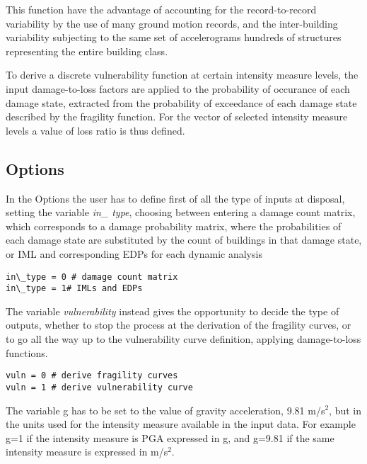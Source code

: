 This function have the advantage of accounting for the record-to-record variability by the use of many ground motion records, and the inter-building variability subjecting to the same set of accelerograms hundreds of structures representing the entire building class.

To derive a discrete vulnerability function at certain intensity measure levels, the input damage-to-loss factors are applied to the probability of occurance of each damage state, extracted from the probability of exceedance of each damage state described by the fragility function. For the vector of selected intensity measure levels a value of loss ratio is thus defined.

\subsection{Options}
\label{subsec:NDMoptions}
In the Options the user has to define first of all the type of inputs at disposal, setting the variable \textit{in\_ type}, choosing between entering a damage count matrix, which corresponds to a damage probability matrix, where the probabilities of each damage state are substituted by the count of buildings in that damage state, or IML and corresponding EDPs for each dynamic analysis

\begin{Verbatim}[frame=single, commandchars=\\\{\}, samepage=true]
in\_type = 0 # damage count matrix 
in\_type = 1# IMLs and EDPs 
\end{Verbatim}

The variable \textit{vulnerability} instead gives the opportunity to decide the type of outputs, whether to stop the process at the derivation of the fragility curves, or to go all the way up to the vulnerability curve definition, applying damage-to-loss functions.

\begin{Verbatim}[frame=single, commandchars=\\\{\}, samepage=true]
vuln = 0 # derive fragility curves 
vuln = 1 # derive vulnerability curve
\end{Verbatim}

The variable g has to be set to the value of gravity acceleration, 9.81 m/s$^2$, but in the units used for the intensity measure available in the input data. For example g=1 if the intensity measure is PGA expressed in g, and g=9.81 if the same intensity measure is expressed in m/s$^2$.

